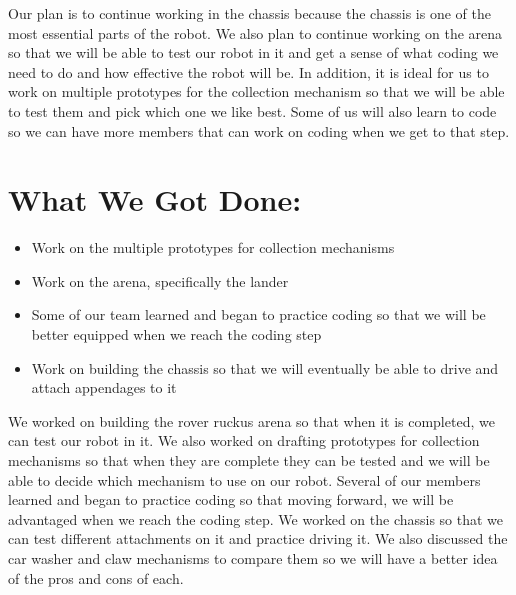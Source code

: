 \documentclass[12pt]{article}
\begin{document}
Our plan is to continue working in the chassis because the chassis is one of the most essential parts of the robot. We also plan to continue working on the arena so that we will be able to test our robot in it and get a sense of what coding we need to do and how effective the robot will be. In addition, it is ideal for us to work on multiple prototypes for the collection mechanism so that we will be able to test them and pick which one we like best. Some of us will also learn to code so we can have more members that can work on coding when we get to that step.

\section{What We Got Done:} %
\begin{itemize}
	\item Work on the multiple prototypes for collection mechanisms
	\item Work on the arena, specifically the lander
\item Some of our team learned and began to practice coding so that we will be better equipped when we reach the coding step
\item Work on building the chassis so that we will eventually be able to drive and attach appendages to it
\end{itemize}

We worked on building the rover ruckus arena so that when it is completed, we can test our robot in it. We also worked on drafting prototypes for collection mechanisms so that when they are complete they can be tested and we will be able to decide which mechanism to use on our robot. Several of our members learned and began to practice coding so that moving forward, we will be advantaged when we reach the coding step. We worked on the chassis so that we can test different attachments on it and practice driving it. We also discussed the car washer and claw mechanisms to compare them so we will have a better idea of the pros and cons of each.
\end{document}
